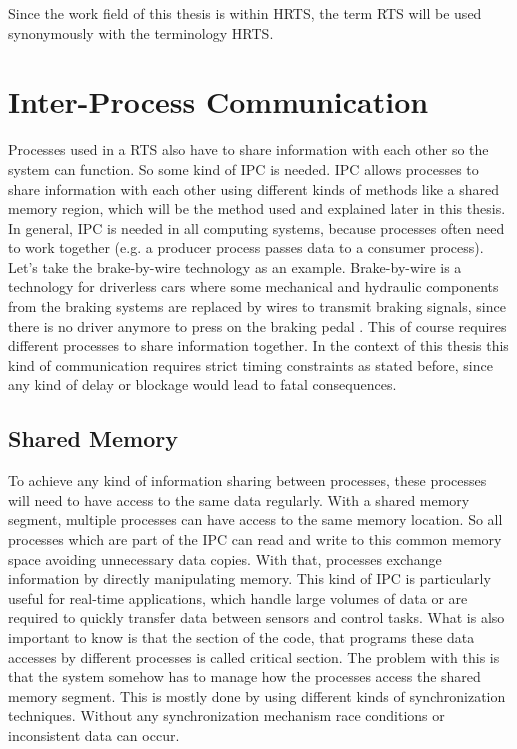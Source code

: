 Since the work field of this thesis is within \ac{HRTS}, the term \ac{RTS} will be used synonymously with the terminology \ac{HRTS}.

\section{Inter-Process Communication}\label{sec:ipc}

Processes used in a \ac{RTS} also have to share information with each other so the system can function. So some kind of \ac{IPC} is needed. \ac{IPC} allows processes to share information with each other using different kinds of methods like a shared memory region, which will be the method used and explained later in this thesis. In general, \ac{IPC} is needed in all computing systems, because processes often need to work together (e.g. a producer process passes data to a consumer process). Let's take the brake-by-wire technology as an example. Brake-by-wire is a technology for driverless cars where some mechanical and hydraulic components from the braking systems are replaced by wires to transmit braking signals, since there is no driver anymore to press on the braking pedal \cite{BrakeByWire}. This of course requires different processes to share information together. In the context of this thesis this kind of communication requires strict timing constraints as stated before, since any kind of delay or blockage would lead to fatal consequences. \cite{IPC,IPCMechanisms}

\subsection{Shared Memory}\label{subsec:shared-memory}

To achieve any kind of information sharing between processes, these processes will need to have access to the same data regularly. With a shared memory segment, multiple processes can have access to the same memory location. So all processes which are part of the \ac{IPC} can read and write to this common memory space avoiding unnecessary data copies. With that, processes exchange information by directly manipulating memory. This kind of \ac{IPC} is particularly useful for real-time applications, which handle large volumes of data or are required to quickly transfer data between sensors and control tasks. What is also important to know is that the section of the code, that programs these data accesses by different processes is called critical section. The problem with this is that the system somehow has to manage how the processes access the shared memory segment. This is mostly done by using different kinds of synchronization techniques. Without any synchronization mechanism race conditions or inconsistent data can occur. \cite{sharedmem}

